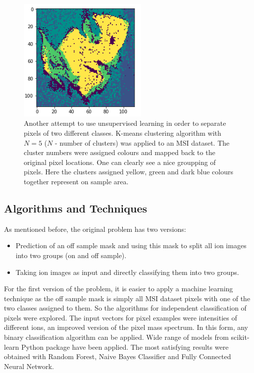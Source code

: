 \documentclass[a4paper]{article}
\begin{document}
\begin{figure}[H]
    \centering
        \includegraphics[width=\textwidth,height=6cm,keepaspectratio]{kmeans_cluster_image.png}
    \caption{Another attempt to use unsupervised learning in order to separate pixels of two different classes.
    K-means clustering algorithm with $N=5$ ($N$ - number of clusters) was applied to an MSI dataset.
    The cluster numbers were assigned colours and mapped back to the original pixel locations.
    One can clearly see a nice groupping of pixels. Here the clusters assigned yellow, green and
    dark blue colours together represent on sample area.}
\end{figure}

\subsection*{Algorithms and Techniques}

As mentioned before, the original problem has two versions:
\begin{itemize}
    \item Prediction of an off sample mask and using this mask to split all ion images
into two groups (on and off sample).
    \item Taking ion images as input and directly classifying them into two groups.
\end{itemize}

For the first version of the problem, it is easier to apply a machine learning technique as
the off sample mask is simply all MSI dataset pixels with one of the two classes assigned to them.
So the algorithms for independent classification of pixels were explored. The input vectors 
for pixel examples were intensities of different ions, an improved version of the pixel mass spectrum.
In this form, any binary classification algorithm can be applied.
Wide range of models from scikit-learn Python package have been applied.
The most satisfying results were obtained with Random Forest, Naive Bayes Classifier and Fully
Connected Neural Network.
\end{document}
